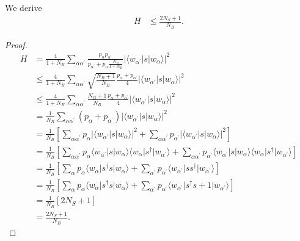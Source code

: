 \documentclass[../../note.tex]{subfiles}
\begin{document}
\begin{lemma}
    We derive
    \begin{align}
        H 
        &\leq \frac{2N_S + 1}{N_B}.
    \end{align}
\end{lemma}
\begin{proof}
\begin{align}
    H 
    &= \frac{4}{1+N_B} \sum_{\alpha \alpha^\prime} \frac{p_{\alpha} p_{\alpha^\prime}}{p_{\alpha^\prime} + p_{\alpha} \frac{N_B}{1+N_B}} \vert \langle w_{\alpha^\prime} \vert s \vert w_{\alpha} \rangle \vert^2 \\
    &\leq \frac{4}{1+N_B} \sum_{\alpha \alpha^\prime} \sqrt{\frac{N_B+1}{N_B}}\frac{p_{\alpha} + p_{\alpha^\prime}}{4} \vert \langle w_{\alpha^\prime} \vert s \vert w_{\alpha} \rangle \vert^2 \\
    &\leq \frac{4}{1+N_B} \sum_{\alpha \alpha^\prime} \frac{N_B+1}{N_B} \frac{p_{\alpha} + p_{\alpha^\prime}}{4} \vert \langle w_{\alpha^\prime} \vert s \vert w_{\alpha} \rangle \vert^2 \\
    &= \frac{1}{N_B} \sum_{\alpha \alpha^\prime} (p_{\alpha} + p_{\alpha^\prime}) \vert \langle w_{\alpha^\prime} \vert s \vert w_{\alpha} \rangle \vert^2 \\
    &= \frac{1}{N_B} \left[ \sum_{\alpha \alpha^\prime} p_{\alpha} \vert \langle w_{\alpha^\prime} \vert s \vert w_{\alpha} \rangle \vert^2 + \sum_{\alpha \alpha^\prime} p_{\alpha^\prime} \vert \langle w_{\alpha^\prime} \vert s \vert w_{\alpha} \rangle \vert^2\right] \\
    &= \frac{1}{N_B} \left[ \sum_{\alpha \alpha^\prime} p_{\alpha} \langle w_{\alpha^\prime} \vert s \vert w_{\alpha} \rangle \langle w_{\alpha} \vert s^\dagger \vert w_{\alpha^\prime} \rangle  + \sum_{\alpha \alpha^\prime} p_{\alpha^\prime} \langle w_{\alpha^\prime} \vert s \vert w_{\alpha} \rangle \langle w_{\alpha} \vert s^\dagger \vert w_{\alpha^\prime} \rangle \right] \\
    &= \frac{1}{N_B}\left[\sum_{\alpha} p_{\alpha} \langle w_{\alpha} \vert s^\dagger s \vert w_{\alpha} \rangle + \sum_{\alpha^\prime} p_{\alpha^\prime} \langle w_{\alpha^\prime} \vert s s^\dagger \vert w_{\alpha^\prime} \rangle\right] \\
    &= \frac{1}{N_B}\left[\sum_{\alpha} p_{\alpha} \langle w_{\alpha} \vert s^\dagger s \vert w_{\alpha} \rangle + \sum_{\alpha^\prime} p_{\alpha^\prime} \langle w_{\alpha^\prime} \vert s^\dagger s +1 \vert w_{\alpha^\prime} \rangle\right] \\
    &= \frac{1}{N_B} \left[2 N_S + 1\right] \\
    &= \frac{2 N_S + 1}{N_B}.
\end{align}
\end{proof}
\end{document}
